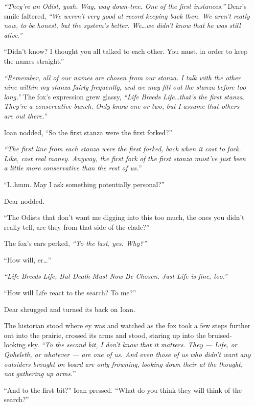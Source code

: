 \emph{``They're an Odist, yeah. Way, way down-tree. One of the first instances.''} Dear's smile faltered, \emph{``We weren't very good at record keeping back then. We aren't really now, to be honest, but the system's better. We\ldots{}we didn't know that he was still alive.''}

``Didn't know? I thought you all talked to each other. You must, in order to keep the names straight.''

\emph{``Remember, all of our names are chosen from our stanza. I talk with the other nine within my stanza fairly frequently, and we may fill out the stanza before too long.''} The fox's expression grew glassy, \emph{``Life Breeds Life\ldots{}that's the first stanza. They're a conservative bunch. Only know one or two, but I assume that others are out there.''}

Ioan nodded, ``So the first stanza were the first forked?''

\emph{``The first line from each stanza were the first forked, back when it cost to fork. Like, cost real money. Anyway, the first fork of the first stanza must've just been a little more conservative than the rest of us.''}

``I\ldots{}hmm. May I ask something potentially personal?''

Dear nodded.

``The Odists that don't want me digging into this too much, the ones you didn't really tell, are they from that side of the clade?''

The fox's ears perked, \emph{``To the last, yes. Why?''}

``How will, er\ldots{}''

\emph{``Life Breeds Life, But Death Must Now Be Chosen. Just Life is fine, too.''}

``How will Life react to the search? To me?''

Dear shrugged and turned its back on Ioan.

The historian stood where ey was and watched as the fox took a few steps further out into the prairie, crossed its arms and stood, staring up into the bruised-looking sky. \emph{``To the second bit, I don't know that it matters. They --- Life, or Qoheleth, or whatever --- are one of us. And even those of us who didn't want any outsiders brought on board are only frowning, looking down their at the thought, not gathering up arms.''}

``And to the first bit?'' Ioan pressed. ``What do you think they will think of the search?''

